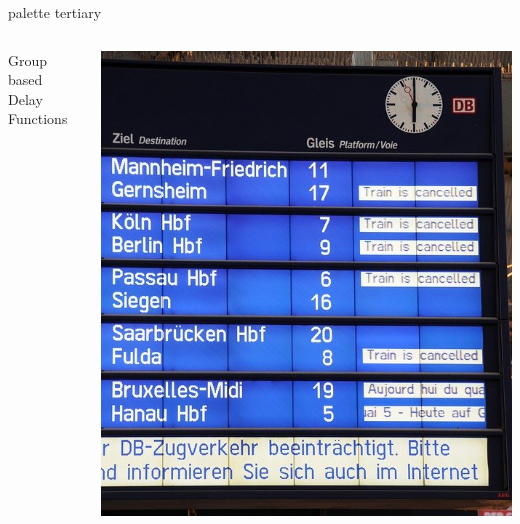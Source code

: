 \documentclass[aspectratio=169]{beamer}
\begin{document}
\begin{frame}[plain]
  \begin{beamercolorbox}[sep=0.1px,center,wd=\paperwidth,ht=\paperheight]{palette tertiary}
    \begin{columns}
      \begin{column}{0.55\textwidth}
        \Huge\centering Group based\\Delay Functions
      \end{column}
      \begin{column}{0.45\textwidth}
        \includegraphics[height=\paperheight]{db.jpg}
      \end{column}
    \end{columns}
  \end{beamercolorbox}
\end{frame}

\end{document}
